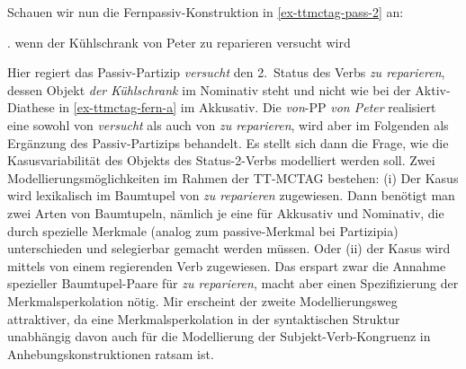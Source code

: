 Schauen wir nun die Fernpassiv-Konstruktion in \ref{ex-ttmctag-pass-2} an:

\ex. \label{ex-ttmctag-pass-2} wenn der Kühlschrank von Peter zu reparieren versucht wird

Hier regiert das Passiv-Partizip {\it versucht} den 2.~Status des Verbs {\it zu reparieren}, dessen Objekt {\it der Kühlschrank} im Nominativ steht und nicht wie bei der Aktiv-Diathese in \ref{ex-ttmctag-fern-a} im Akkusativ. Die \emph{von}-PP {\it von Peter} realisiert eine  sowohl von {\it versucht} als auch von {\it zu reparieren}, wird aber im Folgenden als Ergänzung des Passiv-Partizips behandelt. Es stellt sich dann die Frage, wie die Kasusvariabilität des Objekts des Status-2-Verbs modelliert werden soll. Zwei Modellierungsmöglichkeiten im Rahmen der TT-MCTAG bestehen: (i) Der Kasus wird lexikalisch im Baumtupel von {\it zu reparieren} zugewiesen. Dann benötigt man zwei Arten von Baumtupeln, nämlich je eine für Akkusativ und Nominativ, die durch spezielle Merkmale (analog zum {\sc passive}-Merkmal bei Partizipia) unterschieden und selegierbar gemacht werden müssen. Oder (ii) der Kasus wird mittels  von einem regierenden Verb zugewiesen. Das erspart zwar die Annahme spezieller Baumtupel-Paare für {\it zu reparieren}, macht aber einen Spezifizierung der Merkmalsperkolation nötig. Mir erscheint der zweite Modellierungsweg attraktiver, da eine Merkmalsperkolation in der syntaktischen Struktur unabhängig davon auch für die Modellierung der Subjekt-Verb-Kongruenz in Anhebungskonstruktionen ratsam ist. 

